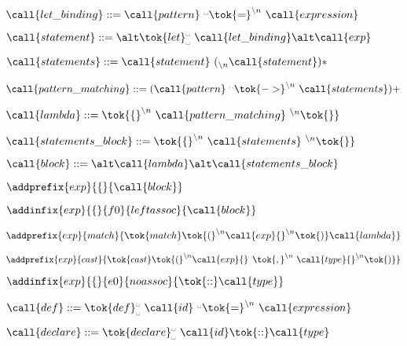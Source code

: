  
   \item $\call{let\_binding} ::= \call{pattern}\
   {}^\textrm\textvisiblespace\tok{=}^{\backslash{}n}\ \call{expression}$
     
 
   \item $\call{statement} ::=\\
   \alt \tok{let}_{\textrm{\textvisiblespace}}^{\textrm{\textvisiblespace}}\ \call{let\_binding}\\
   \alt \call{exp}$
   \item $\call{statements} ::= \call{statement}\ ({}_{\backslash{}n}\call{statement})*$
   \item $\call{pattern\_matching} ::= (\call{pattern}\
   {}^\textrm\textvisiblespace\tok{->}^{\backslash{}n}\ \call{statements})+$

   \item $\call{lambda} ::= \tok{\{}^{\backslash{}n}\ \call{pattern\_matching}\ {}^{\backslash{}n}\tok{\}}$
   \item $\call{statements\_block} ::= \tok{\{}^{\backslash{}n}\ \call{statements}\ {}^{\backslash{}n}\tok{\}}$
   \item $\call{block} ::=\\
   \alt \call{lambda}\\
   \alt \call{statements\_block} $

   
 
   \item $\addprefix{exp}{\{}{\call{block}}$
   \item $\addinfix{exp}{\{}{f0}{leftassoc}{\call{block}}$
    
 
   \item $\addprefix{exp}{match}{\tok{match} \tok{(}^{\backslash{}n} \call{exp} {}^{\backslash{}n}\tok{)} \call{lambda}}$
   
 
   \item $\addprefix{exp}{cast}{\tok{cast}\tok{(}^{\backslash{}n} \call{exp}
   {}^\textrm\textvisiblespace\tok{,}^{\backslash{}n}\ \call{type} {}^{\backslash{}n}\tok{)}}$
   
 
   \item $\addinfix{exp}{\{}{e0}{noassoc}{\tok{::}\call{type}}$
   
 
   \item $\call{def} ::= \tok{def}_\textrm\textvisiblespace^\textrm\textvisiblespace\ \call{id}\ {}^\textrm\textvisiblespace\tok{=}^{\backslash{}n}\ \call{expression}$
    
 
   \item $\call{declare} ::= \tok{declare}_\textrm\textvisiblespace^\textrm\textvisiblespace\ \call{id}\tok{::}\call{type}$
   
